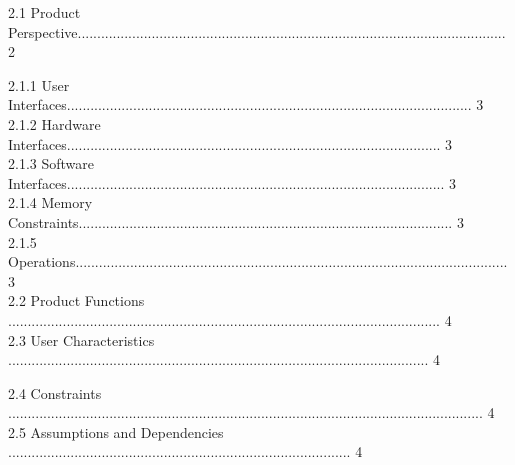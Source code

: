 \documentclass[10pt,draftclsnofoot,onecolumn]{IEEEtran}
\newcommand\tab[1][1cm]{\hspace*{#1}}
\begin{document}
\tab  2.1 Product Perspective.............................................................................................................. 2\\
                 \vspace{5mm}


                
\tab\tab 2.1.1 User Interfaces........................................................................................................ 3\\
                 \vspace{5mm}
\tab\tab 2.1.2 Hardware Interfaces................................................................................................ 3\\
                 \vspace{5mm}
\tab\tab 2.1.3 Software Interfaces................................................................................................. 3\\
                 \vspace{5mm}
\tab\tab 2.1.4 Memory Constraints................................................................................................ 3\\
                 \vspace{5mm}
\tab\tab 2.1.5 Operations............................................................................................................... 3\\
                 \vspace{5mm}
\tab 2.2 Product Functions ............................................................................................................... 4\\
                 \vspace{5mm}
\tab 2.3 User Characteristics ............................................................................................................ 4\\
                 \vspace{5mm}
                 
\tab 2.4 Constraints .......................................................................................................................... 4\\
                 \vspace{5mm}
\tab 2.5 Assumptions and Dependencies ........................................................................................ 4\\
                 \vspace{5mm}
                 
\end{document}
